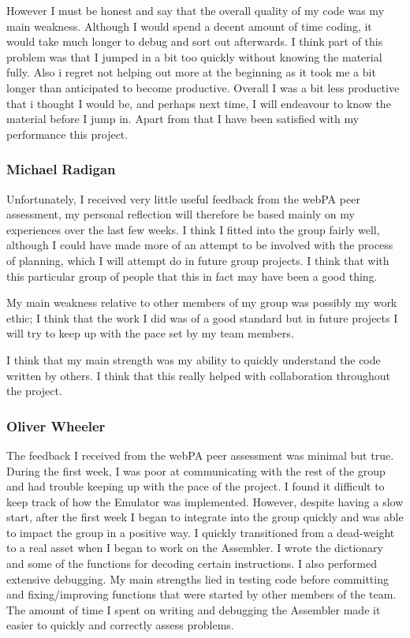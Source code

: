 \documentclass[11pt]{article}
\begin{document}
However I must be honest and say that the overall quality of my code was my main weakness. Although I would spend a decent amount of time coding, it would take much longer to debug and sort out afterwards. I think part of this problem was that I jumped in a bit too quickly without knowing the material fully. Also i regret not helping out more at the beginning as it took me a bit longer than anticipated to become productive. Overall I was a bit less productive that i thought I would be, and perhaps next time, I will endeavour to know the material before I jump in. Apart from that I have been satisfied with my performance this project.


\subsubsection*{Michael Radigan}
Unfortunately, I received very little useful feedback from the webPA peer assessment, my personal reflection will therefore be based mainly on my experiences over the last few weeks. I think I fitted into the group fairly  well, although I could have made more of an attempt to be involved with the process of planning, which I will attempt do in future group projects. I think that with this particular group of people that this in fact may have
been a good thing.

My main weakness relative to other members of my group was possibly my work ethic; I think that the work I did was of a good standard but in future projects I will try to keep up with the pace set by my team members.

I think that my main strength was my ability to quickly understand the code written by others. I think that this really helped with collaboration throughout the project.

\subsubsection*{Oliver Wheeler}
The feedback I received from the webPA peer assessment was minimal but true.
During the first week, I was poor at communicating with the rest of the group and had trouble keeping up with the pace of the project. I found it difficult to keep track of how the Emulator was implemented.
However, despite having a slow start, after the first week I began to integrate into the group quickly and was able to impact the group in a positive way. I quickly transitioned from a dead-weight to a real asset when I began to work on the Assembler. I wrote the dictionary and some of the functions for decoding certain instructions. I also performed extensive debugging. My main strengths lied in testing code before committing and fixing/improving functions that were started by other members of the team. The amount of time I spent on writing and debugging the Assembler made it easier to quickly and correctly assess problems. 
\end{document}
